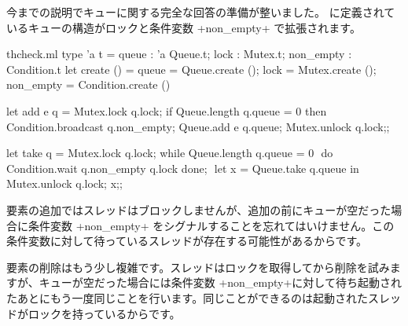今までの説明でキューに関する完全な回答の準備が整いました。 に定義されているキューの構造がロックと条件変数 \ml+non_empty+ で拡張されます。
%
\begin{listingcodefile}[style=numbers]{thcheck.ml}
type 'a t =
  { queue : 'a Queue.t; lock : Mutex.t; non_empty : Condition.t }
let create () =
  { queue = Queue.create ();
    lock = Mutex.create (); non_empty = Condition.create () }

let add e q =
  Mutex.lock q.lock;
  if Queue.length q.queue = 0 then Condition.broadcast q.non_empty;$\label{prog:broadcast}$
  Queue.add e q.queue;
  Mutex.unlock q.lock;;

let take q =
  Mutex.lock q.lock;
  while Queue.length q.queue = 0 $\label{prog:lock}$
  do Condition.wait q.non_empty q.lock done;  $\label{prog:slock}$
  let x = Queue.take q.queue in
  Mutex.unlock q.lock; x;;
\end{listingcodefile}
%
要素の追加ではスレッドはブロックしませんが、追加の前にキューが空だった場合に条件変数 \ml+non_empty+ をシグナルすることを忘れてはいけません。この条件変数に対して待っているスレッドが存在する可能性があるからです。

要素の削除はもう少し複雑です。スレッドはロックを取得してから削除を試みますが、キューが空だった場合には条件変数 \ml+non_empty+に対して待ち起動されたあとにもう一度同じことを行います。同じことができるのは起動されたスレッドがロックを持っているからです。


